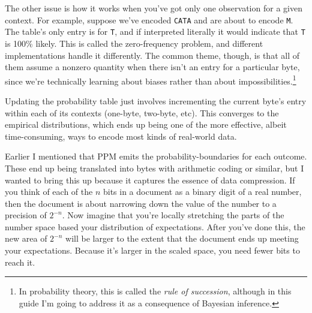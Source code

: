 \documentclass{article}
\begin{document}
    The other issue is how it works when you've got only one observation for a
    given context. For example, suppose we've encoded {\tt CATA} and are about
    to encode {\tt M}. The table's only entry is for {\tt T}, and if
    interpreted literally it would indicate that {\tt T} is 100\% likely. This
    is called the zero-frequency problem, and different implementations handle
    it differently. The common theme, though, is that all of them assume a
    nonzero quantity when there isn't an entry for a particular byte, since
    we're technically learning about biases rather than about
    impossibilities.\footnote{In probability theory, this is called the {\em
    rule of succession}, although in this guide I'm going to address it as a
    consequence of Bayesian inference.}

    Updating the probability table just involves incrementing the current
    byte's entry within each of its contexts (one-byte, two-byte, etc). This
    converges to the empirical distributions, which ends up being one of the
    more effective, albeit time-consuming, ways to encode most kinds of
    real-world data.

    Earlier I mentioned that PPM emits the probability-boundaries for each
    outcome. These end up being translated into bytes with arithmetic coding or
    similar, but I wanted to bring this up because it captures the essence of
    data compression. If you think of each of the $n$ bits in a document as a
    binary digit of a real number, then the document is about narrowing down
    the value of the number to a precision of $2^{-n}$. Now imagine that you're
    locally stretching the parts of the number space based your distribution of
    expectations. After you've done this, the new area of $2^{-n}$ will be
    larger to the extent that the document ends up meeting your expectations.
    Because it's larger in the scaled space, you need fewer bits to reach it.
\end{document}
